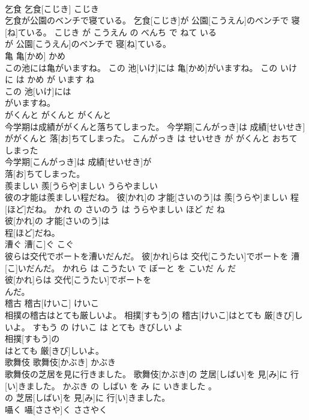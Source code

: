 \documentclass[8pt]{extreport}
\begin{document}
\begin{CJK}{UTF8}{min}
\\	乞食	乞食[こじき]	こじき	
\\	乞食が公園のベンチで寝ている。	乞食[こじき]が 公園[こうえん]のベンチで 寝[ね]ている。	こじき が こうえん の べんち で ねて いる	
\\	が 公園[こうえん]のベンチで 寝[ね]ている。			
\\	亀	亀[かめ]	かめ	
\\	この池には亀がいますね。	この 池[いけ]には 亀[かめ]がいますね。	この いけ に は かめ が います ね	
\\	この 池[いけ]には
\\	がいますね。			
\\	がくんと	がくんと	がくんと	
\\	今学期は成績ががくんと落ちてしまった。	今学期[こんがっき]は 成績[せいせき]ががくんと 落[お]ちてしまった。	こんがっき は せいせき が がくんと おちて しまった	
\\	今学期[こんがっき]は 成績[せいせき]が
\\	落[お]ちてしまった。			
\\	羨ましい	羨[うらや]ましい	うらやましい	
\\	彼の才能は羨ましい程だね。	彼[かれ]の 才能[さいのう]は 羨[うらや]ましい 程[ほど]だね。	かれ の さいのう は うらやましい ほど だ ね	
\\	彼[かれ]の 才能[さいのう]は
\\	程[ほど]だね。			
\\	漕ぐ	漕[こ]ぐ	こぐ	
\\	彼らは交代でボートを漕いだんだ。	彼[かれ]らは 交代[こうたい]でボートを 漕[こ]いだんだ。	かれら は こうたい で ぼーと を こいだ ん だ	
\\	彼[かれ]らは 交代[こうたい]でボートを
\\	んだ。			
\\	稽古	稽古[けいこ]	けいこ	
\\	相撲の稽古はとても厳しいよ。	相撲[すもう]の 稽古[けいこ]はとても 厳[きび]しいよ。	すもう の けいこ は とても きびしい よ	
\\	相撲[すもう]の
\\	はとても 厳[きび]しいよ。			
\\	歌舞伎	歌舞伎[かぶき]	かぶき	
\\	歌舞伎の芝居を見に行きました。	歌舞伎[かぶき]の 芝居[しばい]を 見[み]に 行[い]きました。	かぶき の しばい を み に いきました 。	
\\	の 芝居[しばい]を 見[み]に 行[い]きました。			
\\	囁く	囁[ささや]く	ささやく	

\end{CJK}
\end{document}
